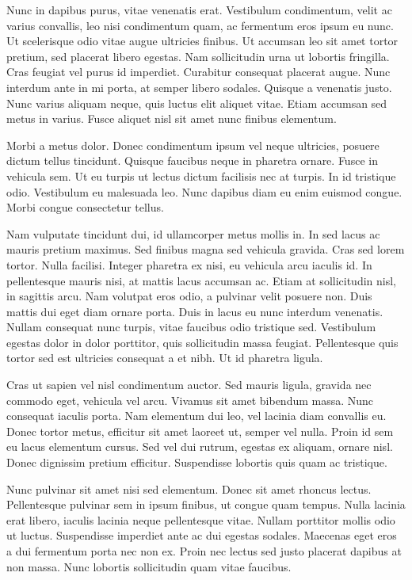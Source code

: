 \documentclass{homework}
\begin{document}
Nunc in dapibus purus, vitae venenatis erat. Vestibulum condimentum, velit ac varius convallis, leo nisi condimentum quam, ac fermentum eros ipsum eu nunc. Ut scelerisque odio vitae augue ultricies finibus. Ut accumsan leo sit amet tortor pretium, sed placerat libero egestas. Nam sollicitudin urna ut lobortis fringilla. Cras feugiat vel purus id imperdiet. Curabitur consequat placerat augue. Nunc interdum ante in mi porta, at semper libero sodales. Quisque a venenatis justo. Nunc varius aliquam neque, quis luctus elit aliquet vitae. Etiam accumsan sed metus in varius. Fusce aliquet nisl sit amet nunc finibus elementum.

Morbi a metus dolor. Donec condimentum ipsum vel neque ultricies, posuere dictum tellus tincidunt. Quisque faucibus neque in pharetra ornare. Fusce in vehicula sem. Ut eu turpis ut lectus dictum facilisis nec at turpis. In id tristique odio. Vestibulum eu malesuada leo. Nunc dapibus diam eu enim euismod congue. Morbi congue consectetur tellus.

Nam vulputate tincidunt dui, id ullamcorper metus mollis in. In sed lacus ac mauris pretium maximus. Sed finibus magna sed vehicula gravida. Cras sed lorem tortor. Nulla facilisi. Integer pharetra ex nisi, eu vehicula arcu iaculis id. In pellentesque mauris nisi, at mattis lacus accumsan ac. Etiam at sollicitudin nisl, in sagittis arcu. Nam volutpat eros odio, a pulvinar velit posuere non. Duis mattis dui eget diam ornare porta. Duis in lacus eu nunc interdum venenatis. Nullam consequat nunc turpis, vitae faucibus odio tristique sed. Vestibulum egestas dolor in dolor porttitor, quis sollicitudin massa feugiat. Pellentesque quis tortor sed est ultricies consequat a et nibh. Ut id pharetra ligula.

Cras ut sapien vel nisl condimentum auctor. Sed mauris ligula, gravida nec commodo eget, vehicula vel arcu. Vivamus sit amet bibendum massa. Nunc consequat iaculis porta. Nam elementum dui leo, vel lacinia diam convallis eu. Donec tortor metus, efficitur sit amet laoreet ut, semper vel nulla. Proin id sem eu lacus elementum cursus. Sed vel dui rutrum, egestas ex aliquam, ornare nisl. Donec dignissim pretium efficitur. Suspendisse lobortis quis quam ac tristique.

Nunc pulvinar sit amet nisi sed elementum. Donec sit amet rhoncus lectus. Pellentesque pulvinar sem in ipsum finibus, ut congue quam tempus. Nulla lacinia erat libero, iaculis lacinia neque pellentesque vitae. Nullam porttitor mollis odio ut luctus. Suspendisse imperdiet ante ac dui egestas sodales. Maecenas eget eros a dui fermentum porta nec non ex. Proin nec lectus sed justo placerat dapibus at non massa. Nunc lobortis sollicitudin quam vitae faucibus.
\end{document}
